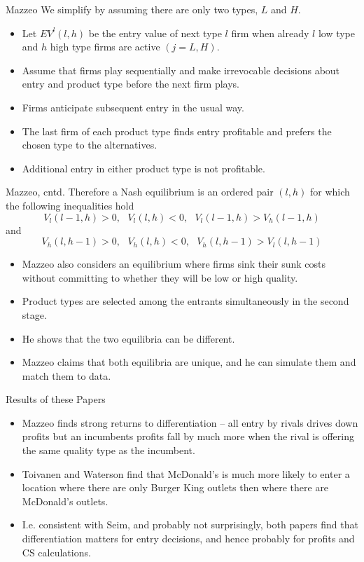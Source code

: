 \documentclass[xcolor=pdftex,dvipsnames,table,mathserif]{beamer}
\begin{document}
\begin{frame}{Mazzeo}
We simplify by assuming there are only two types, $L$ and $H$.
\begin{itemize}
\item Let $EV^{l}(l,h)$ be the entry value of next type $l$ firm when
already $l$ low type and $h$ high type firms are active $(j=L,H)$.
\item Assume that firms play sequentially and make irrevocable decisions
about entry and product type before the next firm plays.
\item Firms anticipate subsequent entry in the usual way.
\item The last firm of each product type finds entry profitable and prefers
the chosen type to the alternatives.
\item Additional entry in either product type is not profitable.
\end{itemize}
\end{frame}

\begin{frame}{Mazzeo, cntd.}
Therefore a Nash equilibrium is an ordered pair $(l,h)$ for which the
following inequalities hold 
\begin{equation*}
V_{l}(l-1,h)>0,\text{ }V_{l}(l,h)<0,\text{ }V_{l}(l-1,h)>V_{h}(l-1,h)
\end{equation*}%
and 
\begin{equation*}
V_{h}(l,h-1)>0,\text{ }V_{h}(l,h)<0,\text{ }V_{h}(l,h-1)>V_{l}(l,h-1)
\end{equation*}
\begin{itemize}
\item Mazzeo also considers an equilibrium where firms sink their sunk costs
without committing to whether they will be low or high quality.
\item Product types are selected among the entrants simultaneously in the
second stage.
\item He shows that the two equilibria can be different.
\item Mazzeo claims that both equilibria are unique, and he can simulate
them and match them to data.
\end{itemize}
\end{frame}

\begin{frame}{Results of these Papers}
\begin{itemize}
\item Mazzeo finds strong returns to differentiation -- all entry by rivals
drives down profits but an incumbents profits fall by much more when the
rival is offering the same quality type as the incumbent.
\item Toivanen and Waterson find that McDonald's is much more likely to
enter a location where there are only Burger King outlets then where there
are McDonald's outlets.
\item I.e. consistent with Seim, and probably not surprisingly, both papers
find that differentiation matters for entry decisions, and hence probably
for profits and CS calculations.
\end{itemize}
\end{frame}
\end{document}
